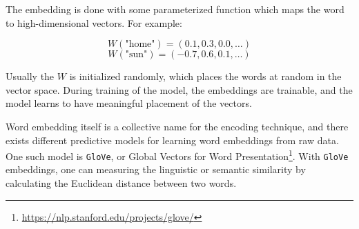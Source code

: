 The embedding is done with some parameterized function which maps the word to high-dimensional vectors. For example:

\begin{equation}
    W(\text{"home"}) = (0.1, 0.3, 0.0, \ldots)
\end{equation}
\begin{equation}
    W(\text{"sun"}) = (-0.7, 0.6, 0.1, \ldots)
\end{equation}

Usually the \(W\) is initialized randomly, which places the words at random in the vector space. During training of the model, the embeddings are trainable, and the model learns to have meaningful placement of the vectors.

Word embedding itself is a collective name for the encoding technique, and there exists different predictive models for learning word embeddings from raw data. One such model is {\tt GloVe}, or Global Vectors for Word Presentation\footnote{\url{https://nlp.stanford.edu/projects/glove/}}. With {\tt GloVe} embeddings, one can measuring the linguistic or semantic similarity by calculating the Euclidean distance between two words.